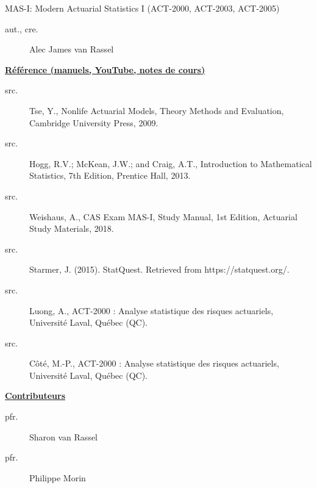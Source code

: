 \begin{contrib}{MAS-I: Modern Actuarial Statistics I (ACT-2000, ACT-2003, ACT-2005)}
\begin{description}
	\item[aut., cre.] Alec James van Rassel
\end{description}

\textbf{\underline{Référence (manuels, YouTube, notes de cours)}}
\begin{description}
	\item[src.]	Tse, Y., Nonlife Actuarial Models, Theory Methods and Evaluation, Cambridge University Press, 2009.
	\item[src.]	Hogg, R.V.; McKean, J.W.; and Craig, A.T., Introduction to Mathematical Statistics, 7th Edition, Prentice Hall, 2013.
	\item[src.]	Weishaus, A., CAS Exam MAS-I, Study Manual, 1st Edition, Actuarial Study Materials, 2018.
	\item[src.]	Starmer, J. (2015). StatQuest. Retrieved from https://statquest.org/.
	\item[src.]	Luong, A., ACT-2000 : Analyse statistique des risques actuariels, Université Laval, Québec (QC).
	\item[src.]	Côté, M.-P., ACT-2000 : Analyse statistique des risques actuariels, Université Laval, Québec (QC).
\end{description}

\textbf{\underline{Contributeurs}}
\begin{description}
	\item[pfr.]	Sharon van Rassel
	\item[pfr.]	Philippe Morin
\end{description}
\end{contrib}
